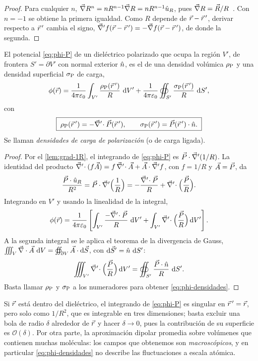 \begin{proof}
Para cualquier $n$, $\vec\nabla R^n=nR^{n-1}\vec\nabla R=nR^{n-1}\hat u_{R}$, pues $\vec\nabla R=\vec R/R$~\cite{T0}. Con $n=-1$ se
obtiene la primera igualdad. Como $R$ depende de $\vec r-\vec r\,'$, derivar respecto a $\vec r\,'$ cambia el signo,
$\vec\nabla'f(\vec r-\vec r\,')=-\vec\nabla f(\vec r-\vec r\,')$, de donde la segunda.
\end{proof}

\begin{teorema}\label{teo:densidades}
El potencial \eqref{eq:phi-P} de un dieléctrico polarizado que ocupa la región $V'$, de frontera
$S'=\partial V'$ con normal exterior $\hat n$, es el de una densidad volúmica $\rho_{\mathrm P}$ y una densidad superficial
$\sigma_{\mathrm P}$ de carga,
\begin{equation}\label{eq:phi-densidades}
  \phi(\vec r)=\frac{1}{4\pi\varepsilon_0}\int_{V'}\frac{\rho_{\mathrm P}(\vec r\,')}{R}\,\mathop{}\!\mathrm{d} V'
            +\frac{1}{4\pi\varepsilon_0}\oiint_{S'}\frac{\sigma_{\mathrm P}(\vec r\,')}{R}\,\mathop{}\!\mathrm{d} S' ,
\end{equation}
con
\begin{equation}\label{eq:rhoP-sigmaP}
  \boxed{\;\rho_{\mathrm P}(\vec r\,')=-\vec\nabla'\!\cdot\vec P(\vec r\,'),\qquad \sigma_{\mathrm P}(\vec r\,')=\vec P(\vec r\,')\cdot\hat n .\;}
\end{equation}
Se llaman \emph{densidades de carga de polarización} (o de carga ligada).
\end{teorema}

\begin{proof}
Por el \cref{lem:grad-1R}, el integrando de \eqref{eq:phi-P} es $\vec P\cdot\vec\nabla'(1/R)$. La identidad del producto
$\vec\nabla'\!\cdot(f\vec A)=f\,\vec\nabla'\!\cdot\vec A+\vec A\cdot\vec\nabla'f$, con $f=1/R$ y $\vec A=\vec P$, da
\[
  \frac{\vec P\cdot\hat u_{R}}{R^2}=\vec P\cdot\vec\nabla'\Big(\frac1R\Big)
  =-\frac{\vec\nabla'\!\cdot\vec P}{R}+\vec\nabla'\!\cdot\Big(\frac{\vec P}{R}\Big).
\]
Integrando en $V'$ y usando la linealidad de la integral,
\[
  \phi(\vec r)=\frac{1}{4\pi\varepsilon_0}\left[\int_{V'}\frac{-\vec\nabla'\!\cdot\vec P}{R}\,\mathop{}\!\mathrm{d} V'
            +\int_{V'}\vec\nabla'\!\cdot\Big(\frac{\vec P}{R}\Big)\mathop{}\!\mathrm{d} V'\right].
\]
A la segunda integral se le aplica el teorema de la divergencia de Gauss,
$\iiint_{V}\vec\nabla\cdot\vec A\,\mathop{}\!\mathrm{d} V=\oiint_{\partial V}\vec A\cdot\mathop{}\!\mathrm{d}\vec S$, con $\mathop{}\!\mathrm{d}\vec S'=\hat n\,\mathop{}\!\mathrm{d} S'$:
\[
  \iiint_{V'}\vec\nabla'\!\cdot\Big(\frac{\vec P}{R}\Big)\mathop{}\!\mathrm{d} V'=\oiint_{S'}\frac{\vec P\cdot\hat n}{R}\,\mathop{}\!\mathrm{d} S' .
\]
Basta llamar $\rho_{\mathrm P}$ y $\sigma_{\mathrm P}$ a los numeradores para obtener \eqref{eq:phi-densidades}.
\end{proof}

\begin{observacion}\label{obs:singular}
Si $\vec r$ está dentro del dieléctrico, el integrando de \eqref{eq:phi-P} es singular en $\vec r\,'=\vec r$, pero solo como
$1/R^2$, que es integrable en tres dimensiones; basta excluir una bola de radio $\delta$ alrededor de $\vec r$ y hacer
$\delta\to0$, pues la contribución de su superficie es $\mathcal O(\delta)$. Por otra parte, la aproximación dipolar
promedia sobre volúmenes que contienen muchas moléculas: los campos que obtenemos son \emph{macroscópicos}, y en
particular \eqref{eq:phi-densidades} no describe las fluctuaciones a escala atómica.
\end{observacion}

